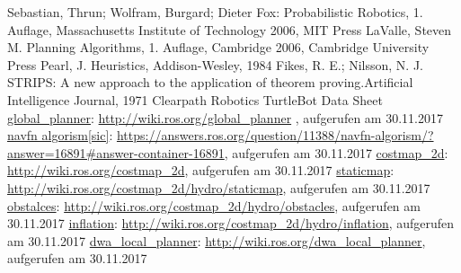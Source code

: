 \begin{thebibliography}{999}%
 Sebastian, Thrun; Wolfram, Burgard; Dieter Fox: \glqq Probabilistic Robotics\grqq , 1. Auflage, Massachusetts Institute of Technology 2006, MIT Press
 LaValle, Steven M. \glqq Planning Algorithms\grqq , 1. Auflage, Cambridge 2006, Cambridge University Press
 Pearl, J. \glqq Heuristics\grqq , Addison-Wesley, 1984
 Fikes, R. E.; Nilsson, N. J.  \glqq STRIPS: A new approach to the application of theorem proving.\grqq Artificial Intelligence Journal, 1971
 Clearpath Robotics \glqq TurtleBot Data Sheet 
 \href{http://wiki.ros.org/global_planner}{global\_planner}:  \url{http://wiki.ros.org/global_planner} , aufgerufen am 30.11.2017
 \href{https://answers.ros.org/question/11388/navfn-algorism/?answer=16891#answer-container-16891}{navfn algorism[sic]}: \url{https://answers.ros.org/question/11388/navfn-algorism/?answer=16891#answer-container-16891}, aufgerufen am 30.11.2017
 \href{http://wiki.ros.org/costmap_2d}{costmap\_2d}: \url{http://wiki.ros.org/costmap_2d}, aufgerufen am 30.11.2017
 \href{http://wiki.ros.org/costmap_2d/hydro/staticmap}{staticmap}: \url{http://wiki.ros.org/costmap_2d/hydro/staticmap}, aufgerufen am 30.11.2017
 \href{http://wiki.ros.org/costmap_2d/hydro/obstacles}{obstalces}: \url{http://wiki.ros.org/costmap_2d/hydro/obstacles}, aufgerufen am 30.11.2017
 \href{http://wiki.ros.org/costmap_2d/hydro/inflation}{inflation}: \url{http://wiki.ros.org/costmap_2d/hydro/inflation}, aufgerufen am 30.11.2017
 \href{http://wiki.ros.org/dwa_local_planner}{dwa\_local\_planner}: \url{http://wiki.ros.org/dwa_local_planner}, aufgerufen am 30.11.2017



\end{thebibliography}